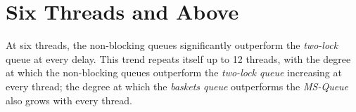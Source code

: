 \section{Six Threads and Above}
At six threads, the non-blocking queues significantly outperform the \emph{two-lock}
queue at every delay. This trend repeats itself up to 12 threads, with the
degree at which the non-blocking queues outperform the \emph{two-lock queue}
increasing at every thread; the degree at which the \emph{baskets queue} outperforms
the \emph{MS-Queue} also grows with every thread.

